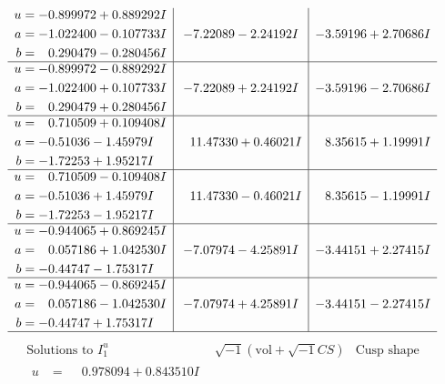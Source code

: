 \documentclass[1p]{elsarticle_modified}
\theoremstyle{definition}
\newcommand{\I}{\sqrt{-1}}
\begin{document}
$$\begin{array}{c|c|c}
\begin{aligned}
u &= -0.899972 + 0.889292 I \\
a &= -1.022400 - 0.107733 I \\
b &= \phantom{-}0.290479 - 0.280456 I\end{aligned}
 & -7.22089 - 2.24192 I & -3.59196 + 2.70686 I \\ \hline\begin{aligned}
u &= -0.899972 - 0.889292 I \\
a &= -1.022400 + 0.107733 I \\
b &= \phantom{-}0.290479 + 0.280456 I\end{aligned}
 & -7.22089 + 2.24192 I & -3.59196 - 2.70686 I \\ \hline\begin{aligned}
u &= \phantom{-}0.710509 + 0.109408 I \\
a &= -0.51036 - 1.45979 I \\
b &= -1.72253 + 1.95217 I\end{aligned}
 & \phantom{-}11.47330 + 0.46021 I & \phantom{-}8.35615 + 1.19991 I \\ \hline\begin{aligned}
u &= \phantom{-}0.710509 - 0.109408 I \\
a &= -0.51036 + 1.45979 I \\
b &= -1.72253 - 1.95217 I\end{aligned}
 & \phantom{-}11.47330 - 0.46021 I & \phantom{-}8.35615 - 1.19991 I \\ \hline\begin{aligned}
u &= -0.944065 + 0.869245 I \\
a &= \phantom{-}0.057186 + 1.042530 I \\
b &= -0.44747 - 1.75317 I\end{aligned}
 & -7.07974 - 4.25891 I & -3.44151 + 2.27415 I \\ \hline\begin{aligned}
u &= -0.944065 - 0.869245 I \\
a &= \phantom{-}0.057186 - 1.042530 I \\
b &= -0.44747 + 1.75317 I\end{aligned}
 & -7.07974 + 4.25891 I & -3.44151 - 2.27415 I\\
 \hline 
 \end{array}$$\newpage$$\begin{array}{c|c|c}  
\text{Solutions to }I^u_{1}& \I (\text{vol} + \sqrt{-1}CS) & \text{Cusp shape}\\
 \hline 
\begin{aligned}
u &= \phantom{-}0.978094 + 0.843510 I \\

\end{aligned}
\end{array}$$
\end{document}
